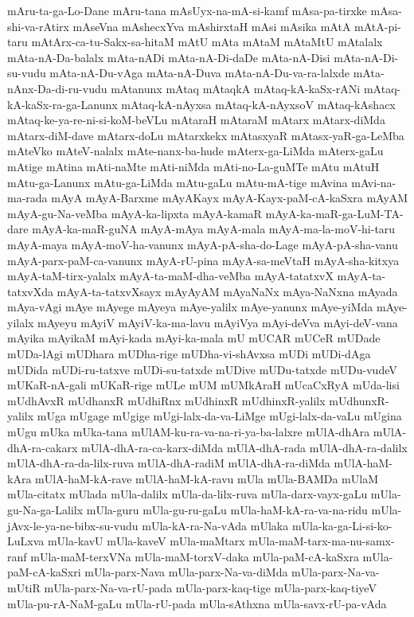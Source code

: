 {mAru-ta-ga-Lo-Dane
mAru-tana
mAsUyx-na-mA-si-kamf
mAsa-pa-tirxke
mAsa-shi-va-rAtirx
mAseVna
mAshecxYva
mAshirxtaH
mAsi
mAsika
mAtA
mAtA-pi-taru
mAtArx-ca-tu-Sakx-sa-hitaM
mAtU
mAta
mAtaM
mAtaMtU
mAtalalx
mAta-nA-Da-balalx
mAta-nADi
mAta-nA-Di-daDe
mAta-nA-Disi
mAta-nA-Di-su-vudu
mAta-nA-Du-vAga
mAta-nA-Duva
mAta-nA-Du-va-ra-lalxde
mAta-nAnx-Da-di-ru-vudu
mAtanunx
mAtaq
mAtaqkA
mAtaq-kA-kaSx-rANi
mAtaq-kA-kaSx-ra-ga-Lanunx
mAtaq-kA-nAyxsa
mAtaq-kA-nAyxsoV
mAtaq-kAshacx
mAtaq-ke-ya-re-ni-si-koM-beVLu
mAtaraH
mAtaraM
mAtarx
mAtarx-diMda
mAtarx-diM-dave
mAtarx-doLu
mAtarxkekx
mAtasxyaR
mAtasx-yaR-ga-LeMba
mAteVko
mAteV-nalalx
mAte-nanx-ba-hude
mAterx-ga-LiMda
mAterx-gaLu
mAtige
mAtina
mAti-naMte
mAti-niMda
mAti-no-La-guMTe
mAtu
mAtuH
mAtu-ga-Lanunx
mAtu-ga-LiMda
mAtu-gaLu
mAtu-mA-tige
mAvina
mAvi-na-ma-rada
mAyA
mAyA-Barxme
mAyAKayx
mAyA-Kayx-paM-cA-kaSxra
mAyAM
mAyA-gu-Na-veMba
mAyA-ka-lipxta
mAyA-kamaR
mAyA-ka-maR-ga-LuM-TA-dare
mAyA-ka-maR-guNA
mAyA-mAya
mAyA-mala
mAyA-ma-la-moV-hi-taru
mAyA-maya
mAyA-moV-ha-vanunx
mAyA-pA-sha-do-Lage
mAyA-pA-sha-vanu
mAyA-parx-paM-ca-vanunx
mAyA-rU-pina
mAyA-sa-meVtaH
mAyA-sha-kitxya
mAyA-taM-tirx-yalalx
mAyA-ta-maM-dha-veMba
mAyA-tatatxvX
mAyA-ta-tatxvXda
mAyA-ta-tatxvXsayx
mAyAyAM
mAyaNaNx
mAya-NaNxna
mAyada
mAya-vAgi
mAye
mAyege
mAyeya
mAye-yalilx
mAye-yanunx
mAye-yiMda
mAye-yilalx
mAyeyu
mAyiV
mAyiV-ka-ma-lavu
mAyiVya
mAyi-deVva
mAyi-deV-vana
mAyika
mAyikaM
mAyi-kada
mAyi-ka-mala
mU
mUCAR
mUCeR
mUDade
mUDa-lAgi
mUDhara
mUDha-rige
mUDha-vi-shAvxsa
mUDi
mUDi-dAga
mUDida
mUDi-ru-tatxve
mUDi-su-tatxde
mUDive
mUDu-tatxde
mUDu-vudeV
mUKaR-nA-gali
mUKaR-rige
mULe
mUM
mUMkAraH
mUcaCxRyA
mUda-lisi
mUdhAvxR
mUdhanxR
mUdhiRnx
mUdhinxR
mUdhinxR-yalilx
mUdhunxR-yalilx
mUga
mUgage
mUgige
mUgi-lalx-da-va-LiMge
mUgi-lalx-da-vaLu
mUgina
mUgu
mUka
mUka-tana
mUlAM-ku-ra-va-na-ri-ya-ba-lalxre
mUlA-dhAra
mUlA-dhA-ra-cakarx
mUlA-dhA-ra-ca-karx-diMda
mUlA-dhA-rada
mUlA-dhA-ra-dalilx
mUlA-dhA-ra-da-lilx-ruva
mUlA-dhA-radiM
mUlA-dhA-ra-diMda
mUlA-haM-kAra
mUlA-haM-kA-rave
mUlA-haM-kA-ravu
mUla
mUla-BAMDa
mUlaM
mUla-citatx
mUlada
mUla-dalilx
mUla-da-lilx-ruva
mUla-darx-vayx-gaLu
mUla-gu-Na-ga-Lalilx
mUla-guru
mUla-gu-ru-gaLu
mUla-haM-kA-ra-va-na-ridu
mUla-jAvx-le-ya-ne-bibx-su-vudu
mUla-kA-ra-Na-vAda
mUlaka
mUla-ka-ga-Li-si-ko-LuLxva
mUla-kavU
mUla-kaveV
mUla-maMtarx
mUla-maM-tarx-ma-nu-samx-ranf
mUla-maM-terxVNa
mUla-maM-torxV-daka
mUla-paM-cA-kaSxra
mUla-paM-cA-kaSxri
mUla-parx-Nava
mUla-parx-Na-va-diMda
mUla-parx-Na-va-mUtiR
mUla-parx-Na-va-rU-pada
mUla-parx-kaq-tige
mUla-parx-kaq-tiyeV
mUla-pu-rA-NaM-gaLu
mUla-rU-pada
mUla-sAthxna
mUla-savx-rU-pa-vAda
}
